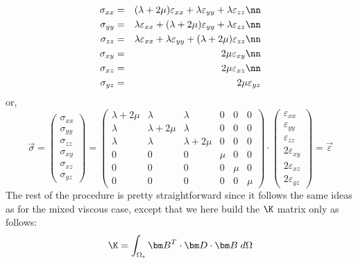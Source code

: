 \begin{eqnarray}
\sigma_{xx} &=& (\lambda+2\mu)  \varepsilon_{xx} + \lambda \varepsilon_{yy} + \lambda \varepsilon_{zz} \nn\\
\sigma_{yy} &=& \lambda \varepsilon_{xx} + (\lambda+2\mu)  {\varepsilon}_{yy} + \lambda \varepsilon_{zz}\nn\\
\sigma_{zz} &=& \lambda \varepsilon_{xx} + \lambda \varepsilon_{yy} + (\lambda+2\mu)  {\varepsilon}_{zz} \nn\\
\sigma_{xy} &=& 2\mu  {\varepsilon}_{xy} \nn\\
\sigma_{xz} &=& 2\mu  {\varepsilon}_{xz} \nn\\
\sigma_{yz} &=& 2\mu  {\varepsilon}_{yz} 
\end{eqnarray}
or, 
\[
\vec\sigma =
\left(
\begin{array}{c}
\sigma_{xx}\\ 
\sigma_{yy} \\
\sigma_{zz} \\
\sigma_{xy} \\
\sigma_{xz} \\
\sigma_{yz} 
\end{array}
\right)
=
\left(
\begin{array}{cccccc}
\lambda+2\mu & \lambda & \lambda & 0 & 0 & 0 \\
\lambda & \lambda+2\mu & \lambda & 0 & 0 & 0 \\
\lambda & \lambda & \lambda+2\mu & 0 & 0 & 0 \\
0 & 0 & 0 & \mu & 0 & 0\\
0 & 0 & 0 & 0 & \mu & 0\\
0 & 0 & 0 & 0 & 0 & \mu
\end{array}
\right)
\cdot
\left(
\begin{array}{c}
\varepsilon_{xx} \\
\varepsilon_{yy} \\
\varepsilon_{zz} \\
2\varepsilon_{xy} \\
2\varepsilon_{xz} \\
2\varepsilon_{yz} 
\end{array}
\right)
=\vec\varepsilon
\]
The rest of the procedure is pretty straightforward since it follows the same 
ideas as for the mixed viscous case, except that we here build the $\K$ matrix 
only as follows:
\[
\K=\int_{\Omega_e} {\bm B}^T \cdot {\bm D} \cdot {\bm B} \; d\Omega 
\]




